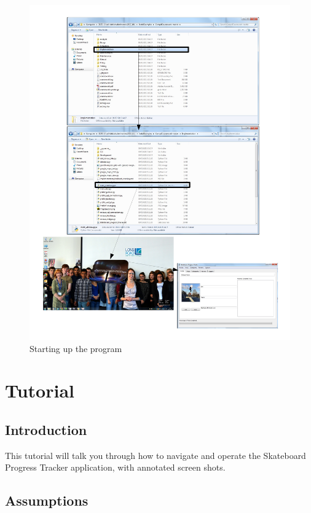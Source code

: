 \begin{figure}[H]
    \includegraphics[width=\textwidth]{./Manual/Images/RunningProgram.pdf}
    \caption{Starting up the program} \label{fig:Running Program}
\end{figure}







\section{Tutorial}

\subsection{Introduction}

This tutorial will talk you through how to navigate and operate the Skateboard Progress Tracker application, with annotated screen shots.

\subsection{Assumptions}


